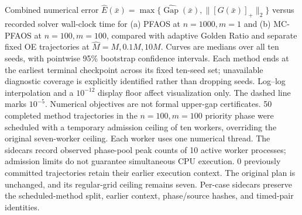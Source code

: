 \caption{Combined numerical error $\widehat E(\bar x)=\max\{\widehat{\operatorname{Gap}}(\bar x),\|[G(\bar x)]_+\|_2\}$ versus recorded solver wall-clock time for (a) PFAOS at $n=1000,m=1$ and (b) MC-PFAOS at $n=100,m=100$, compared with adaptive Golden Ratio and separate fixed OE trajectories at $\widehat M=M,0.1M,10M$. Curves are medians over all ten seeds, with pointwise 95\% bootstrap confidence intervals. Each method ends at the earliest terminal checkpoint across its fixed ten-seed set; unavailable diagnostic coverage is explicitly identified rather than dropping seeds. Log--log interpolation and a $10^{-12}$ display floor affect visualization only. The dashed line marks $10^{-5}$. Numerical objectives are not formal upper-gap certificates. 50 completed method trajectories in the $n=100,m=100$ priority phase were scheduled with a temporary admission ceiling of ten workers, overriding the original seven-worker ceiling. Each worker uses one numerical thread. The sidecars record observed phase-pool peak counts of 10 active worker processes; admission limits do not guarantee simultaneous CPU execution. 0 previously committed trajectories retain their earlier execution context. The original plan is unchanged, and its regular-grid ceiling remains seven. Per-case sidecars preserve the scheduled-method split, earlier context, phase/source hashes, and timed-pair identities.}
